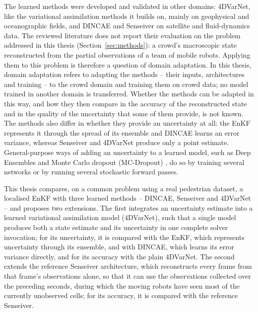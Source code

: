 \documentclass[english, 12pt, a4paper, elec, utf8, a-2b, online]{aaltothesis}
\begin{document}
The learned methods were developed and validated in other domains:
4DVarNet, like the variational assimilation methods it builds on,
mainly on geophysical and oceanographic fields, and DINCAE and
Senseiver on satellite and fluid-dynamics data. The reviewed literature does
not report their evaluation on the problem addressed in this
thesis (Section~\ref{sec:methods}): a crowd's macroscopic state
reconstructed from the partial observations of a team of mobile robots.
Applying them to this problem is therefore a question of domain adaptation. In
this thesis, domain adaptation refers to adapting the methods -- their inputs,
architectures and training -- to the crowd domain and training them on crowd
data; no model trained in another domain is transferred. Whether the methods
can be adapted in this way, and how they then compare in the accuracy of the
reconstructed state and in the quality of the uncertainty that some of them
provide, is not known. The methods also differ in whether they provide an
uncertainty at all: the EnKF represents it through the spread of its
ensemble and DINCAE learns an error variance, whereas Senseiver and
4DVarNet produce only a point estimate. General-purpose ways of adding
an uncertainty to a learned model, such as Deep Ensembles
\cite{lakshminarayanan2017deepensembles} and Monte Carlo dropout (MC-Dropout)
\cite{gal2016mcdropout}, do so by training several networks or by
running several stochastic forward passes.

This thesis compares, on a common problem using a real pedestrian
dataset, a localised EnKF with three learned methods -- DINCAE,
Senseiver and 4DVarNet -- and proposes two extensions. The first
integrates an uncertainty estimate into a learned variational
assimilation model (4DVarNet), such that a single model produces both a
state estimate and its uncertainty in one complete solver invocation; for its
uncertainty, it is compared with the EnKF, which represents uncertainty
through its ensemble, and with DINCAE, which learns its error variance
directly, and for its accuracy with the plain 4DVarNet. The second
extends the reference Senseiver architecture, which reconstructs every frame
from that frame's observations alone, so that it can use the
observations collected over the preceding seconds, during which the moving
robots have seen most of the currently unobserved cells; for
its accuracy, it is compared with the reference Senseiver.

\end{document}
